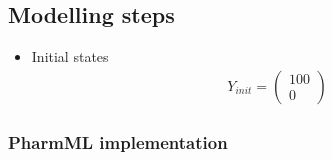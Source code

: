 \subsection*{Modelling steps}

\begin{itemize}
\item
Initial states
\begin{align}
& Y_{init} = \left( \begin{array}{c} 100 \\ 0 \end{array} \right) \nonumber
\end{align}
\end{itemize}


\subsubsection*{PharmML implementation}

